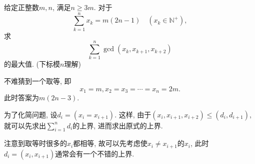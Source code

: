 \documentclass[lang=cn,12pt,thmcnt=section]{elegantbook}
\begin{document}
\begin{example}
给定正整数$m,n$, 满足$n\ge 3m$. 对于
\[\sum_{k=1}^{n}x_{k}=m(2n-1) \quad (x_{k}\in \mathbb{N}^+),\]
求
\[ \sum_{k=1}^{n}\gcd(x_{k},x_{k+1},x_{k+2}) \]
的最大值. (下标模$n$理解)
\end{example}

\begin{analysis}
不难猜到一个取等, 即
\[x_1=m,x_2=x_3=\cdots=x_n=2m.\]
此时答案为$m(2n-3)$.\par 
为了化简问题, 设$d_i=(x_i=x_{i+1})$. 这样, 由于$(x_i,x_{i+1},x_{i+2})\le (d_i,d_{i+1})$, 就可以先求出$\sum_{i=1}^nd_i$的上界, 进而求出原式的上界.\par 
注意到取等时很多的$x_i$都相等, 故可以先考虑使$x_i\neq x_{i+1}$的$x_i$, 此时$d_i=(x_i,x_{i+1})$通常会有一个不错的上界.
\end{analysis}
\end{document}
